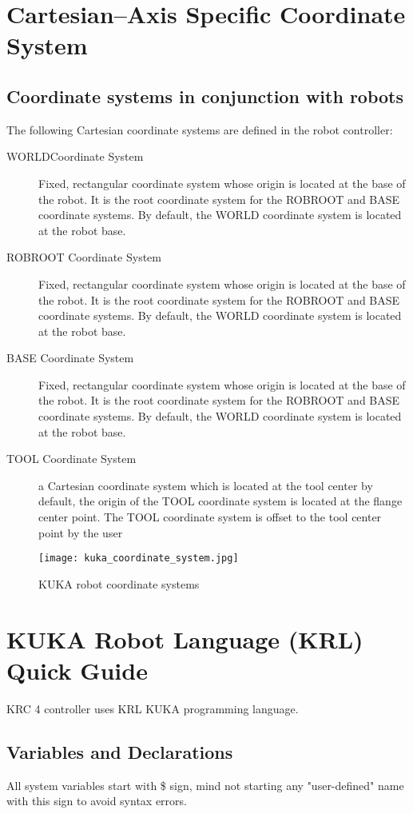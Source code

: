 \section{Cartesian--Axis Specific Coordinate System}

\subsection{Coordinate systems in conjunction with robots}
The following Cartesian coordinate systems are defined in the robot controller:
\begin{description}
	\item [WORLDCoordinate System] 
	Fixed, rectangular coordinate system whose origin is located at the base of the robot. It is the root coordinate system for the ROBROOT and BASE coordinate systems.
	By default, the WORLD coordinate system is located at the robot base.
	\item [ROBROOT Coordinate System]
	Fixed, rectangular coordinate system whose origin is located at the base of the robot. It is the root coordinate system for the ROBROOT and BASE coordinate systems.
	By default, the WORLD coordinate system is located at the robot base.
	\item [BASE Coordinate System]
	Fixed, rectangular coordinate system whose origin is located at the base of the robot. It is the root coordinate system for the ROBROOT and BASE coordinate systems.
	By default, the WORLD coordinate system is located at the robot base.
	\item [TOOL Coordinate System]
	a Cartesian coordinate system which is located at the tool center by default, the origin of the TOOL coordinate system is located at the flange center point. The TOOL coordinate system is offset to the tool center point by the user
\end{description}
\begin{figure}[H]
	\centering
\texttt{[image: kuka\_coordinate\_system.jpg]}
	\caption{KUKA robot coordinate systems}
\end{figure} 

\section{KUKA Robot Language (KRL) Quick Guide}
KRC 4 controller uses KRL KUKA programming language.
\subsection{Variables and Declarations}
All system variables start with \$ sign, mind not starting any "user-defined" name with this sign to avoid syntax errors.

